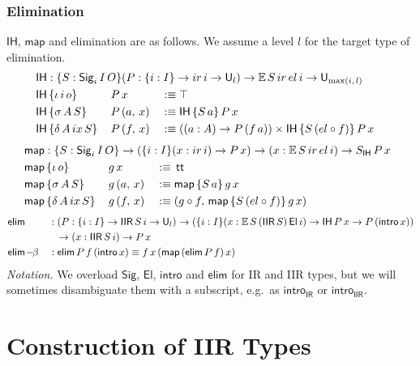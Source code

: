 \documentclass[acmsmall,screen,review,anonymous]{acmart}
\newcommand{\msf}[1]{{\mathsf{#1}}}
\newcommand{\mbb}[1]{\mathbb{#1}}
\newcommand{\U}{\msf{U}}
\newcommand{\El}{\msf{El}}
\newcommand{\Sig}{\msf{Sig}}
\newcommand{\ttt}{\msf{tt}}
\newcommand{\ir}{{ir}}
\newcommand{\el}{{el}}
\newcommand{\ix}{{ix}}
\newcommand{\IR}{\msf{IR}}
\newcommand{\intro}{\msf{intro}}
\newcommand{\IH}{\msf{IH}}
\newcommand{\map}{\msf{map}}
\newcommand{\elim}{\msf{elim}}
\newcommand{\IIR}{\msf{IIR}}
\newcommand{\E}{\mbb{E}}
\begin{document}
\subsubsection{Elimination}\label{sec:iir-elimination} $\IH$, $\map$ and elimination are
as follows. We assume a level $l$ for the target type of elimination.
\begin{alignat*}{3}
  &\rlap{$\IH : \{S : \Sig_i\,I\,O\}(P : \{i : I\}\to \ir\,i \to \U_l) \to \E\,S\,\ir\,\el\,i \to \U_{\max(i,\,l)}$} \\
  &\IH\,\{\iota\,i\,o      \}\,&&P\,x       &&:\equiv \top \\
  &\IH\,\{\sigma\,A\,S     \}\,&&P\,(a,\,x) &&:\equiv \IH\,\{S\,a\}\,P\,x \\
  &\IH\,\{\delta\,A\,\ix\,S\}\,&&P\,(f,\,x) &&:\equiv ((a : A) \to P\,(f\,a)) \times \IH\,\{S\,(\el \circ f)\}\,P\,x
\end{alignat*}
\begin{alignat*}{3}
  &\hspace{-7em}\rlap{$\map : \{S : \Sig_i\,I\,O\} \to (\{i : I\}(x : \ir\,i) \to P\,x) \to (x : \E\,S\,\ir\,\el\,i) \to S_\IH\,P\,x$} \\
  &\hspace{-7em}\map\,\{\iota\,o    \}\,&&g\,x       &&:\equiv\,\ttt \\
  &\hspace{-7em}\map\,\{\sigma\,A\,S\}\,&&g\,(a,\,x) &&:\equiv \map\,\{S\,a\}\,g\,x \\
  &\hspace{-7em}\map\,\{\delta\,A\,\ix\,S\}\,&&g\,(f,\,x) &&:\equiv (g \circ f,\,\map\,\{S\,(\el \circ f)\}\,g\,x)
\end{alignat*}
\begin{alignat*}{3}
  &\elim           &&: (P : \{i : I\}\to \IIR\,S\,i \to \U_l) \to (\{i : I\}(x : \E\,S\,(\IIR\,S)\,\El\,i) \to \IH\,P\,x \to P\,(\intro\,x))\\
  &                && \hspace{0.7em}\to (x : \IIR\,S\,i) \to P\,x \\
  &\elim\!-\!\!\beta &&: \elim\,P\,f\,(\intro\,x) \equiv f\,x\,(\map\,(\elim\,P\,f)\,x)
\end{alignat*}
\emph{Notation.} We overload $\Sig$, $\El$, $\intro$ and $\elim$ for IR and IIR types, but we will sometimes disambiguate them
with a subscript, e.g.\ as $\intro_\IR$ or $\intro_\IIR$.

\section{Construction of IIR Types}\label{sec:iir-construction}
\end{document}
